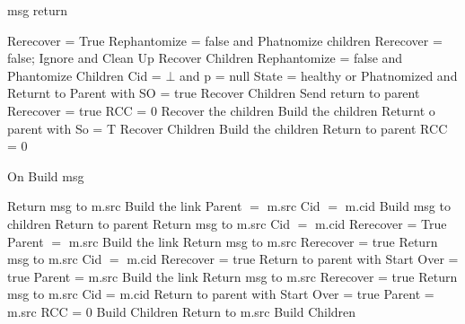 \documentclass{article}
\begin{document}
\begin{algorithm}
\caption{msg return}
\label{ build or recoveryDone message received}
\begin{algorithmic}[1]
				\State Rerecover = True
			\EndIf
				\State Rephantomize = false and Phatnomize children
				\State Rerecover = false;
					\State Ignore and Clean Up
				\Else
					\State Recover Children
				\EndIf
			\EndIf
		\Else
				\State Rephantomize = false and Phantomize Children
				\State Cid = $\bot$ and p = null
				\State State = healthy or Phatnomized and  Returnt to Parent with SO = true
				\State Recover Children
			\Else
				\State Send return to parent
			\EndIf
		\EndIf
				\State Rerecover = true
			\EndIf
					\State RCC = 0
					\State Recover the children
				\Else
					\State Build the children
				\EndIf
			\EndIf
		\Else
				\State Returnt o parent with So = T
					\State Recover Children
				\Else
					\State Build the children
				\EndIf
			\Else
				\State Return to parent
				\State RCC = 0
			\EndIf
		\EndIf
	\EndIf
\EndIf
\EndProcedure
\end{algorithmic}
\end{algorithm}	


	
\begin{algorithm}
\caption{On Build msg}
\label{Build message received}
\begin{algorithmic}[1]
	\State Return msg to m.src
	\State Build the link
	\State Parent $=$ m.src
	\State Cid $=$ m.cid
		\State Build msg to children
	\Else
		\State Return to parent
	\EndIf
{}
	\State Return msg to m.src
			\State Cid $=$ m.cid
			\State Rerecover = True
			\State Parent $=$ m.src
			\State Build the link
			\State Return msg to m.src
		\Else
			\State Rerecover = true
			\State Return msg to m.src
		\EndIf
	\Else
			\State Cid $=$ m.cid
			\State Rerecover = true
			\State Return to parent with Start Over = true
			\State Parent = m.src
			\State Build the link
			\State Return msg to m.src
		\Else
			\State Rerecover = true
			\State Return msg to m.src
		\EndIf
	\EndIf
{}
		\State Cid = m.cid
		\State Return to parent with Start Over = true
		\State Parent = m.src
		\State RCC = 0
		\State Build Children
	\Else
		\State Return to m.src
		\State Build Children
	\EndIf
\EndIf
\EndProcedure
\end{algorithmic}
\end{algorithm}	
\end{document}

